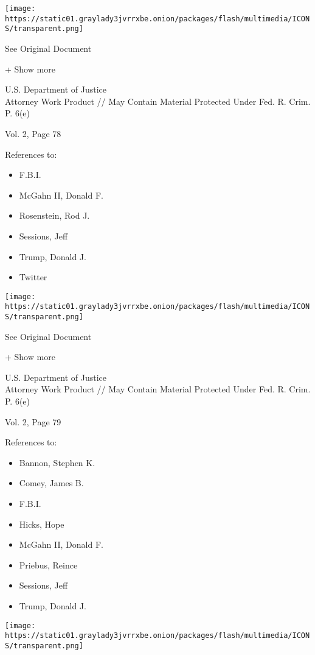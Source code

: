 \protect\hyperlink{}{}

\texttt{[image: https://static01.graylady3jvrrxbe.onion/packages/flash/multimedia/ICONS/transparent.png]}

See Original Document

+ Show more

U.S. Department of Justice\\
Attorney Work Product // May Contain Material Protected Under Fed. R.
Crim. P. 6(e)

Vol. 2, Page 78

References to:

\begin{itemize}
\tightlist
\item
  F.B.I.
\item
  McGahn II, Donald F.
\item
  Rosenstein, Rod J.
\item
  Sessions, Jeff
\item
  Trump, Donald J.
\item
  Twitter
\end{itemize}

\protect\hyperlink{}{}

\texttt{[image: https://static01.graylady3jvrrxbe.onion/packages/flash/multimedia/ICONS/transparent.png]}

See Original Document

+ Show more

U.S. Department of Justice\\
Attorney Work Product // May Contain Material Protected Under Fed. R.
Crim. P. 6(e)

Vol. 2, Page 79

References to:

\begin{itemize}
\tightlist
\item
  Bannon, Stephen K.
\item
  Comey, James B.
\item
  F.B.I.
\item
  Hicks, Hope
\item
  McGahn II, Donald F.
\item
  Priebus, Reince
\item
  Sessions, Jeff
\item
  Trump, Donald J.
\end{itemize}

\protect\hyperlink{}{}

\texttt{[image: https://static01.graylady3jvrrxbe.onion/packages/flash/multimedia/ICONS/transparent.png]}

